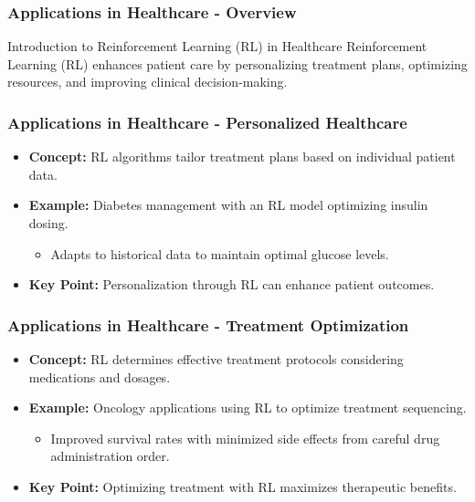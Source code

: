 \documentclass{beamer}
\begin{document}
\begin{frame}[fragile]
    \frametitle{Applications in Healthcare - Overview}
    \begin{block}{Introduction to Reinforcement Learning (RL) in Healthcare}
        Reinforcement Learning (RL) enhances patient care by personalizing treatment plans, optimizing resources, and improving clinical decision-making. 
    \end{block}
\end{frame}

\begin{frame}[fragile]
    \frametitle{Applications in Healthcare - Personalized Healthcare}
    \begin{itemize}
        \item \textbf{Concept:} RL algorithms tailor treatment plans based on individual patient data.
        \item \textbf{Example:} Diabetes management with an RL model optimizing insulin dosing.
        \begin{itemize}
            \item Adapts to historical data to maintain optimal glucose levels.
        \end{itemize}
        \item \textbf{Key Point:} Personalization through RL can enhance patient outcomes.
    \end{itemize}
\end{frame}

\begin{frame}[fragile]
    \frametitle{Applications in Healthcare - Treatment Optimization}
    \begin{itemize}
        \item \textbf{Concept:} RL determines effective treatment protocols considering medications and dosages.
        \item \textbf{Example:} Oncology applications using RL to optimize treatment sequencing.
        \begin{itemize}
            \item Improved survival rates with minimized side effects from careful drug administration order.
        \end{itemize}
        \item \textbf{Key Point:} Optimizing treatment with RL maximizes therapeutic benefits.
    \end{itemize}
\end{frame}
\end{document}

